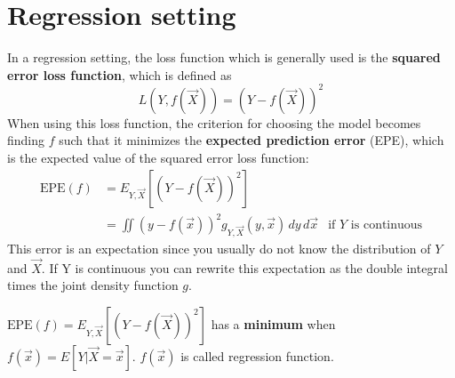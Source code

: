  \section{Regression setting}
    In a regression setting, the loss function which is generally used is the \textbf{squared error loss function}, which is defined as
    $$L(Y,f(\vec{X})) = (Y-f(\vec{X}))^2$$
    When using this loss function, the criterion for choosing the model becomes finding $f$ such that it minimizes the \textbf{expected prediction error} (EPE), which is the expected value of the squared error loss function:
    \begin{align*}
      \text{EPE}(f) & = E_{Y,\vec{X}}[(Y-f(\vec{X}))^2] \\
                    & = \iint (y - f(\vec{x}))^2 g_{Y,\vec{X}}(y, \vec{x})\,dy\,d\vec{x} & \text{if } Y \text{ is continuous}
    \end{align*}
    This error is an expectation since you usually do not know the distribution of $Y$ and $\vec{X}$.
    If Y is continuous you can rewrite this expectation as the double integral times the joint density function $g$.
    
    \begin{theorem}
      $\text{EPE}(f) = E_{Y,\vec{X}}[(Y-f(\vec{X}))^2]$ has a \textbf{minimum} when 
      $f(\vec{x}) = E[Y|\vec{X} = \vec{x}]$.
      $f(\vec{x})$ is called regression function.
    \end{theorem}

